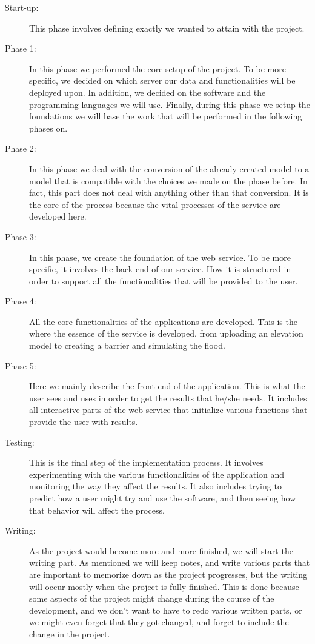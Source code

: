 \begin{description}
	\item [Start-up:]
This phase involves defining exactly we wanted to attain with the project.

  \item[Phase 1:] In this phase we performed the core setup of the project. To be more specific, we decided on which server our data and functionalities will be deployed upon. In addition, we decided on the software and the programming languages  we will use. Finally, during this phase we setup the foundations we will base the work that will be performed in the following phases on.
  
  \item[Phase 2:] In this phase we deal with the conversion of the already created model to a model that is compatible with the choices we made on the phase before. In fact, this part does not deal with anything other than that conversion. It is the core of the process because the vital processes of the service are developed here.
  
  \item[Phase 3:] In this phase, we create the foundation of the web service. To be more specific, it involves the back-end of our service. How it is structured in order to support all the functionalities that will be provided to the user. 
  
  \item[Phase 4:] All the core functionalities of the applications are developed. This is the where the essence of the service is developed, from uploading an elevation model to creating a barrier and simulating the flood. 
  
  \item[Phase 5:]Here we mainly describe the front-end of the application. This is what the user sees and uses in order to get the results that he/she needs. It includes all interactive parts of the web service that initialize various functions  that provide the user with results.
  
  \item[Testing:] This is the final step of the implementation process. It involves experimenting with the various functionalities of the application and monitoring the way they affect the results. It also includes trying to predict how a user might try and use the software, and then seeing how that behavior will affect the process.
  
  \item[Writing:]As the project would become more and more finished, we will start the writing part. As mentioned we will keep notes, and write various parts that are important to memorize down as the project progresses, but the writing will occur mostly when the project is fully finished. This is done because some aspects of the project might change during the course of the development, and we don't want to have to redo various written parts, or we might even forget that they got changed, and forget to include the change in the project. 
  

\end{description}

